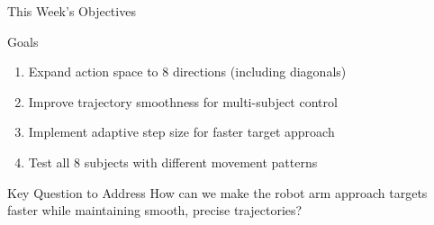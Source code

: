 \documentclass[aspectratio=169, 11pt]{beamer}
\begin{document}
\begin{frame}{This Week's Objectives}
    \begin{block}{Goals}
        \begin{enumerate}
            \item Expand action space to 8 directions (including diagonals)
            \item Improve trajectory smoothness for multi-subject control
            \item Implement adaptive step size for faster target approach
            \item Test all 8 subjects with different movement patterns
        \end{enumerate}
    \end{block}
    
    \vspace{5mm}
    
    \begin{alertblock}{Key Question to Address}
        How can we make the robot arm approach targets faster while maintaining smooth, precise trajectories?
    \end{alertblock}
\end{frame}
\end{document}
